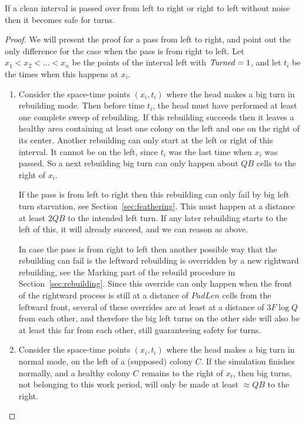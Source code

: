 \documentclass[11pt]{memoir}
\theoremstyle{definition} %
\newcommand{\fld}[1]{\ensuremath{\textit{#1\/}}}
\def\B{B}
\newcommand{\F}{F}
\newcommand{\Q}{Q} %
\newcommand{\PadLen}{\mathit{PadLen}} %
\newcommand{\Turned}{\fld{Turned}} %
\begin{document}
\begin{lemma}\label{lem:safe-for-turns}
  If a clean interval is passed over from left to right or right to left without noise then it becomes safe for turns.
\end{lemma}
\begin{proof}
  We will present the proof for a pass from left to right, and point out the only difference for the case
  when the pass is from right to left.
  Let \( x_{1}<x_{2}<\dots<x_{n} \) be the points of the interval left with \( \Turned=1 \), and let
  \( t_{i} \) be the times when this happens at \( x_{i} \).
  \begin{enumerate}
  \item Consider the space-time points \( (x_{i},t_{i}) \)
    where the head makes a big turn in rebuilding mode.
    Then before time \( t_{i} \), the head must have performed at least one complete sweep of rebuilding.
    If this rebuilding succeeds then it leaves a healthy area containing at least one colony on the left and one
    on the right of its center.
    Another rebuilding can only start at the left or right of this interval.
    It cannot be on the left, since \( t_{i} \) was the last time when \( x_{i} \) was passed.
    So a next rebuilding big turn can only happen about \( \Q\B \) cells to the right of \( x_{i} \).

    If the pass is from left to right then 
    this rebuilding can only fail by big left turn starvation, see Section~\ref{sec:feathering}.
    This must happen at a distance at least \( 2\Q\B \) to the intended left turn.
    If any later rebuilding starts to the left of this, it will already succeed, and we can reason as above.

    In case the pass is from right to left then another possible way that the rebuilding can fail
    is the leftward rebuilding is overridden by a new rightward rebuilding, see the Marking part of the
    rebuild procedure in Section~\ref{sec:rebuilding}.
    Since this override can only happen when the front of the rightward process is still at a distance of
    \( \PadLen \) cells from the leftward front, several of these overrides are at least at a distance of \( 3\F\log\Q \)
    from each other, and therefore the big left turns on the other side will also be at least this far
    from each other, still guaranteeing safety for turns.
 
  \item Consider the space-time points \( (x_{i},t_{i}) \)
    where the head makes a big turn in normal mode, on the left of a (supposed) colony \( C \).
    If the simulation finishes normally, and a healthy colony \( C \) remains to the right of \( x_{i} \), then
    big turns, not belonging to this work period, will only be made at least \( \approx \Q\B \) to the right.


\end{enumerate}
\end{proof}
\end{document}
